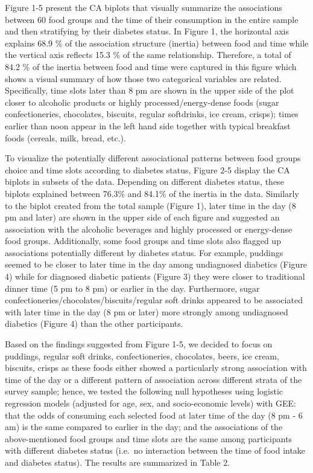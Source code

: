 \documentclass[utf8]{frontiersSCNS}
\begin{document}
Figure 1-5 present the CA biplots that visually summarize the
associations between 60 food groups and the time of their consumption in
the entire sample and then stratifying by their diabetes status. In
Figure 1, the horizontal axis explains 68.9 \% of the association
structure (inertia) between food and time while the vertical axis
reflects 15.3 \% of the same relationship. Therefore, a total of 84.2 \%
of the inertia between food and time were captured in this figure which
shows a visual summary of how those two categorical variables are
related. Specifically, time slots later than 8 pm are shown in the upper
side of the plot closer to alcoholic products or highly
processed/energy-dense foods (sugar confectioneries, chocolates,
biscuits, regular softdrinks, ice cream, crisps); times earlier than
noon appear in the left hand side together with typical breakfast foods
(cereals, milk, bread, etc.).

To visualize the potentially different associational patterns between
food groups choice and time slots according to diabetes status, Figure
2-5 display the CA biplots in subsets of the data. Depending on
different diabetes status, these biplots explained between 76.3\% and
84.1\% of the inertia in the data. Similarly to the biplot created from
the total sample (Figure 1), later time in the day (8 pm and later) are
shown in the upper side of each figure and suggested an association with
the alcoholic beverages and highly processed or energy-dense food
groups. Additionally, some food groups and time slots also flagged up
associations potentially different by diabetes status. For example,
puddings seemed to be closer to later time in the day among undiagnosed
diabetics (Figure 4) while for diagnosed diabetic patients (Figure 3)
they were closer to traditional dinner time (5 pm to 8 pm) or earlier in
the day. Furthermore, sugar confectioneries/chocolates/biscuits/regular
soft drinks appeared to be associated with later time in the day (8 pm
or later) more strongly among undiagnosed diabetics (Figure 4) than the
other participants.

Based on the findings suggested from Figure 1-5, we decided to focus on
puddings, regular soft drinks, confectioneries, chocolates, beers, ice
cream, biscuits, crisps as these foods either showed a particularly
strong association with time of the day or a different pattern of
association across different strata of the survey sample; hence, we
tested the following null hypotheses using logistic regression models
(adjusted for age, sex, and socio-economic levels) with GEE: that the
odds of consuming each selected food at later time of the day (8 pm - 6
am) is the same compared to earlier in the day; and the associations of
the above-mentioned food groups and time slots are the same among
participants with different diabetes status (i.e.~no interaction between
the time of food intake and diabetes status). The results are summarized
in Table 2.
\end{document}

